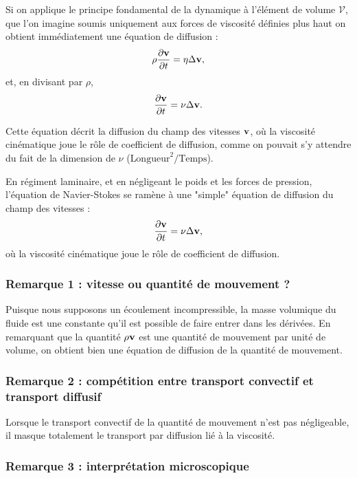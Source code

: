 \documentclass[11pt,a4paper]{report}
\begin{document}
Si on applique le principe fondamental de la dynamique à l'élément de volume $\mathcal{V}$, que l'on imagine soumis uniquement aux forces de viscosité définies plus haut on obtient immédiatement une équation de diffusion :
\begin{equation}
	\rho\frac{\partial \bold{v}}{\partial t} = \eta \Delta\bold{v},
\end{equation}
et, en divisant par $\rho$,
\begin{equation}
	\frac{\partial \bold{v}}{\partial t} = \nu \Delta\bold{v}.
\end{equation}

Cette équation décrit la diffusion du champ des vitesses $\bold{v}$, où la viscosité cinématique joue le rôle de coefficient de diffusion, comme on pouvait s'y attendre du fait de la dimension de $\nu$ ($\text{Longueur}^2/\text{Temps}$). 

En régiment laminaire, et en négligeant le poids et les forces de pression, l'équation de Navier-Stokes se ramène à une "simple" équation de diffusion du champ des vitesses :
\begin{equation}
	\frac{\partial \bold{v}}{\partial t} = \nu \Delta \bold{v},
\end{equation}
où la viscosité cinématique joue le rôle de coefficient de diffusion.

\subsubsection{Remarque 1 : vitesse ou quantité de mouvement ?}
Puisque nous supposons un écoulement incompressible, la masse volumique du fluide est une constante qu'il est possible de faire entrer dans les dérivées.
En remarquant que la quantité $\rho \bold{v}$ est une quantité de mouvement par unité de volume, on obtient bien une équation de diffusion de la quantité de mouvement.

\subsubsection{Remarque 2 : compétition entre transport convectif et transport diffusif}
Lorsque le transport convectif de la quantité de mouvement n'est pas négligeable, il masque totalement le transport par diffusion lié à la viscosité. 

\subsubsection{Remarque 3 : interprétation microscopique}
\end{document}
